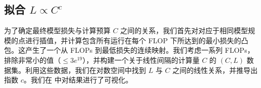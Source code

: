 \begin{table}[htb]
    \centering
    \setlength{\tabcolsep}{16pt}
    \renewcommand{\arraystretch}{1}
    \caption{\textbf{早期融合的缩放律参数。} 通过回归推导缩放律系数所得结果与使用闭式解所得到的结果非常接近。}
    \label{tab:scaling_laws_closed_form}
\end{table}
\subsection{拟合 \(L \propto C^c\)}

为了确定最终模型损失与计算预算 \(C\) 之间的关系，我们首先对对应于相同模型规模的点进行插值，并计算包含所有运行在每个 FLOP 下所达到的最小损失的凸包。这产生了一个从 FLOPs 到最低损失的连续映射。我们考虑一系列 FLOPs，排除非常小的值（$\leq 3e^{19}$），并构建一个关于线性间隔的计算量 \(C\) 的 \((C, L)\) 数据集。利用这些数据，我们在对数空间中找到 \(L\) 与 \(C\) 之间的线性关系，并推导出指数 \(c\)。我们在  中对结果进行了可视化。

